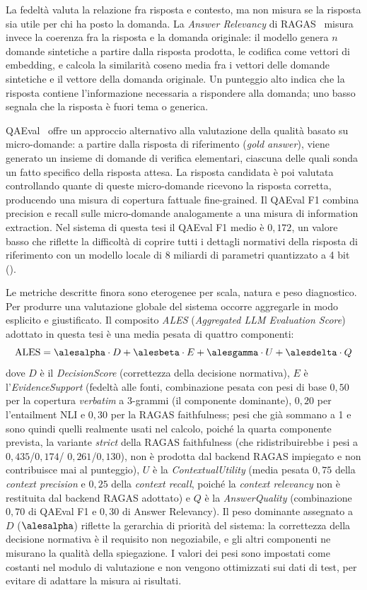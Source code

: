 La fedeltà valuta la relazione fra risposta e contesto, ma non misura se
la risposta sia utile per chi ha posto la domanda. La \emph{Answer Relevancy}
di RAGAS~\cite{ragas2024} misura invece la coerenza fra la risposta e la
domanda originale: il modello genera $n$ domande sintetiche a partire dalla
risposta prodotta, le codifica come vettori di embedding, e calcola la
similarità coseno media fra i vettori delle domande sintetiche e il vettore
della domanda originale. Un punteggio alto indica che la risposta contiene
l'informazione necessaria a rispondere alla domanda; uno basso segnala
che la risposta è fuori tema o generica.

QAEval~\cite{deutsch2021qaeval} offre un approccio alternativo alla valutazione
della qualità basato su micro-domande: a partire dalla risposta di
riferimento (\emph{gold answer}), viene generato un insieme di domande
di verifica elementari, ciascuna delle quali sonda un fatto specifico
della risposta attesa. La risposta candidata è poi valutata controllando
quante di queste micro-domande ricevono la risposta corretta, producendo
una misura di copertura fattuale fine-grained. Il QAEval F1 combina
precision e recall sulle micro-domande analogamente a una misura di
information extraction. Nel sistema di questa tesi il QAEval F1 medio
è $0{,}172$, un valore basso che riflette la difficoltà di coprire
tutti i dettagli normativi della risposta di riferimento con un modello locale di
8 miliardi di parametri quantizzato a 4 bit (\llmmodel).

Le metriche descritte finora sono eterogenee per scala, natura e peso
diagnostico. Per produrre una valutazione globale del sistema occorre
aggregarle in modo esplicito e giustificato. Il composito \emph{ALES}
(\emph{Aggregated LLM Evaluation Score}) adottato in questa tesi è una
media pesata di quattro componenti:
\[
  \text{ALES} = \alesalpha \cdot D + \alesbeta \cdot E + \alesgamma \cdot U + \alesdelta \cdot Q
\]
dove $D$ è il \emph{DecisionScore} (correttezza della decisione normativa),
$E$ è l'\emph{EvidenceSupport} (fedeltà alle fonti, combinazione pesata con pesi
di base $0{,}50$ per la copertura \emph{verbatim} a 3-grammi (il componente
dominante), $0{,}20$ per l'entailment NLI e $0{,}30$ per la RAGAS
faithfulness; pesi che già sommano a 1 e sono quindi quelli realmente usati
nel calcolo, poiché la quarta componente prevista, la variante \emph{strict}
della RAGAS faithfulness (che ridistribuirebbe i pesi a $0{,}435$/$0{,}174$/
$0{,}261$/$0{,}130$), non è prodotta dal backend RAGAS impiegato e non
contribuisce mai al punteggio), $U$ è la \emph{ContextualUtility}
(media pesata $0{,}75$ della \emph{context precision} e $0{,}25$ della
\emph{context recall}, poiché la \emph{context relevancy} non è restituita dal
backend RAGAS adottato) e $Q$ è la \emph{AnswerQuality} (combinazione $0{,}70$ di
QAEval F1 e $0{,}30$ di Answer Relevancy). Il peso dominante assegnato a $D$ ($\alesalpha$) riflette
la gerarchia di priorità del sistema: la correttezza della decisione normativa
è il requisito non negoziabile, e gli altri componenti ne misurano la
qualità della spiegazione. I valori dei pesi sono impostati come costanti nel
modulo di valutazione e non vengono ottimizzati sui dati di test, per evitare
di adattare la misura ai risultati.

